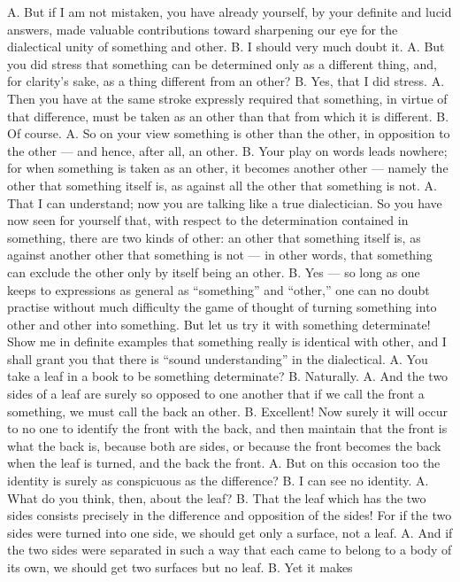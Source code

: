 \documentclass[12pt,a4paper]{book}
\begin{document}
A. But if I am not mistaken, you have already yourself, by your definite and
lucid answers, made valuable contributions toward sharpening our eye for the
dialectical unity of something and other. B. I should very much doubt it.
A. But you did stress that something can be determined only as a different
thing, and, for clarity's sake, as a thing different from an other? B. Yes,
that I did stress. A. Then you have at the same stroke expressly required that
something, in virtue of that difference, must be taken as an other than that
from which it is different. B. Of course. A. So on your view something is
other than the other, in opposition to the other --- and hence, after all, an
other. B. Your play on words leads nowhere; for when something is taken as an
other, it becomes another other --- namely the other that something itself is,
as against all the other that something is not. A. That I can understand; now
you are talking like a true dialectician. So you have now seen for yourself
that, with respect to the determination contained in something, there are two
kinds of other: an other that something itself is, as against another other
that something is not --- in other words, that something can exclude the other
only by itself being an other. B. Yes --- so long as one keeps to expressions
as general as ``something'' and ``other,''
one can no doubt practise without much difficulty the game of thought of
turning something into other and other into something. But let us try it with
something determinate! Show me in definite examples that something really is
identical with other, and I shall grant you that there is ``sound
understanding'' in the dialectical. A. You take a leaf in a book to be
something determinate? B. Naturally. A. And the two sides of a leaf are surely
so opposed to one another that if we call the front a something, we must call
the back an other. B. Excellent! Now surely it will occur to no one to identify
the front with the back, and then maintain that the front is what the back is,
because both are sides, or because the front becomes the back when the leaf is
turned, and the back the front. A. But on this occasion too the identity is
surely as conspicuous as the difference? B. I can see no identity. A. What do
you think, then, about the leaf? B. That the leaf which has the two sides
consists precisely in the difference and opposition of the sides! For if the
two sides were turned into one side, we should get only a surface, not a leaf.
A. And if the two sides were separated in such a way that each came to belong
to a body of its own, we should get two surfaces but no leaf. B. Yet it makes
\end{document}
